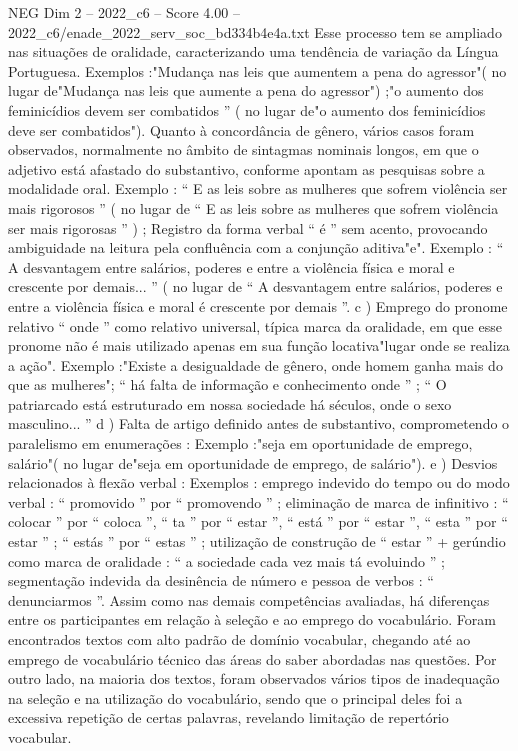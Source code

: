 \begin{textsample}{NEG Dim 2 – 2022\_c6 – Score 4.00 – 2022\_c6/enade\_2022\_serv\_soc\_bd334b4e4a.txt}
Esse processo tem se ampliado nas situações de oralidade, caracterizando uma tendência de variação da Língua Portuguesa.
Exemplos :"Mudança nas leis que aumentem a pena do agressor"( no lugar de"Mudança nas leis que aumente a pena do agressor") ;"o aumento dos feminicídios devem ser combatidos ” ( no lugar de"o aumento dos feminicídios deve ser combatidos").
Quanto à concordância de gênero, vários casos foram observados, normalmente no âmbito de sintagmas nominais longos, em que o adjetivo está afastado do substantivo, conforme apontam as pesquisas sobre a modalidade oral.
Exemplo : “ E as leis sobre as mulheres que sofrem violência ser mais rigorosos ” ( no lugar de “ E as leis sobre as mulheres que sofrem violência ser mais rigorosas ” ) ; Registro da forma verbal “ é ” sem acento, provocando ambiguidade na leitura pela confluência com a conjunção aditiva"e".
Exemplo : “ A desvantagem entre salários, poderes e entre a violência física e moral e crescente por demais... ” ( no lugar de “ A desvantagem entre salários, poderes e entre a violência física e moral é crescente por demais ”. c ) Emprego do pronome relativo “ onde ” como relativo universal, típica marca da oralidade, em que esse pronome não é mais utilizado apenas em sua função locativa"lugar onde se realiza a ação".
Exemplo :"Existe a desigualdade de gênero, onde homem ganha mais do que as mulheres"; “ há falta de informação e conhecimento onde ” ; “ O patriarcado está estruturado em nossa sociedade há séculos, onde o sexo masculino... ” d ) Falta de artigo definido antes de substantivo, comprometendo o paralelismo em enumerações : Exemplo :"seja em oportunidade de emprego, salário"( no lugar de"seja em oportunidade de emprego, de salário"). e ) Desvios relacionados à flexão verbal : Exemplos : emprego indevido do tempo ou do modo verbal : “ promovido ” por “ promovendo ” ; eliminação de marca de infinitivo : “ colocar ” por “ coloca ”, “ ta ” por “ estar ”, “ está ” por “ estar ”, “ esta ” por “ estar ” ; “ estás ” por “ estas ” ; utilização de construção de “ estar ” + gerúndio como marca de oralidade : “ a sociedade cada vez mais tá evoluindo ” ; segmentação indevida da desinência de número e pessoa de verbos : “ denunciarmos ”.
Assim como nas demais competências avaliadas, há diferenças entre os participantes em relação à seleção e ao emprego do vocabulário.
Foram encontrados textos com alto padrão de domínio vocabular, chegando até ao emprego de vocabulário técnico das áreas do saber abordadas nas questões.
Por outro lado, na maioria dos textos, foram observados vários tipos de inadequação na seleção e na utilização do vocabulário, sendo que o principal deles foi a excessiva repetição de certas palavras, revelando limitação de repertório vocabular.

\end{textsample}
